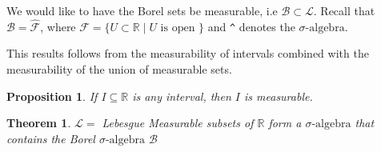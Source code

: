 \documentclass[11pt]{article}
\newtheorem{theorem}{Theorem}[section]
\newtheorem*{prop}{Proposition}
\newcommand{\siga}{\sigma\text{-algebra}}
\begin{document}
    We would like to have the Borel sets be measurable, i.e  $\mathcal{B} \subset \mathcal{L}$.
    Recall that $\mathcal{B} = \hat{\mathcal{F}}$, where $\mathcal{F} = \{ U \subset \mathbb{R} \mid U \text{ is open } \}$ and \verb!^! denotes the $\siga$.

    This results follows from the measurability of intervals combined with the measurability of the union of measurable sets.

    \begin{prop}
        If $I \subseteq \mathbb{R}$ is any interval, then $I$ is measurable.
    \end{prop}

    \begin{theorem}
        $\mathcal{L} =$ Lebesgue Measurable subsets of $\mathbb{R}$ form a $\siga$ that contains the Borel $\siga$ $\mathcal{B}$
    \end{theorem}
\end{document}
